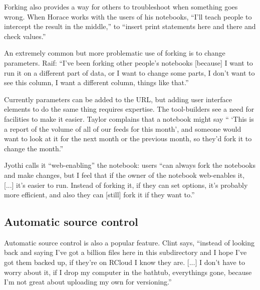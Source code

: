 Forking also provides a way for others to troubleshoot when something goes
wrong.  When Horace works with the users of his notebooks, ``I'll teach people
to intercept the result in the middle,'' to ``insert print statements here and
there and check values.''



An extremely common but more problematic use of forking is to
change parameters. Raif: ``I've been forking other people's notebooks [because]
I want to run it on a different part of data, or I want to change some parts, I
don't want to see this column, I want a different column, things like that.''

Currently parameters can be added to the URL, but adding user interface elements
to do the same thing requires expertise. The tool-builders see a need for
facilities to make it easier. Taylor complains that a notebook might say ``
`This is a report of the volume of all of our feeds for this month', and someone
would want to look at it for the next month or the previous month, so they'd
fork it to change the month.''

Jyothi calls it ``web-enabling'' the notebook: users ``can always fork the
notebooks and make changes, but I feel that if the owner of the notebook
web-enables it, [...] it's easier to run. Instead of
forking it, if they can set options, it's probably more efficient, and also they
can [still] fork it if they want to.''


\subsection{Automatic source control}

Automatic source control is also a popular feature. Clint says, ``instead of
looking back and saying I've got a billion files here in this subdirectory and I
hope I've got them backed up, if they're on RCloud I know they are. [...] I
don't have to worry about it, if I drop my computer in the bathtub, everythings
gone, because I'm not great about uploading my own for versioning.''

